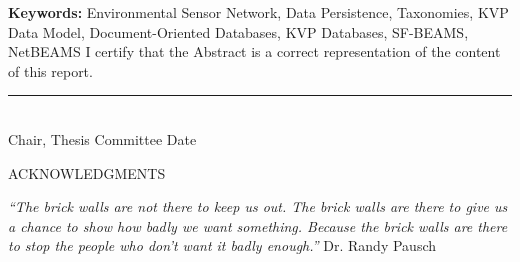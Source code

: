\documentclass[12pt,oneside]{sfsuthesis}
\theoremstyle{plain} %
\theoremstyle{definition}  %
\theoremstyle{remark}  %
\begin{document}
\textbf{Keywords:} Environmental Sensor Network, Data Persistence, Taxonomies,
KVP Data Model, Document-Oriented Databases, KVP Databases, SF-BEAMS, NetBEAMS
\hspace*{\fill}
\noindent
I certify that the Abstract is a correct representation of the content of this
report.

\vspace{.5in} 

\hrule{\hspace{3.75in}} \\[-10pt]
Chair, Thesis Committee 
\hspace{2.5in}
Date
\onehalfspacing
\newpage
\[ \]
\vspace{-1.8in}
\begin{center}{ACKNOWLEDGMENTS}\end{center}

\vspace{.5in}

\noindent
\textit{``The brick walls are not there to keep us out. The brick walls are there
to give us a chance to show how badly we want something. Because the brick walls
are there to stop the people who don't want it badly enough.''} Dr. Randy
Pausch
\end{document}
